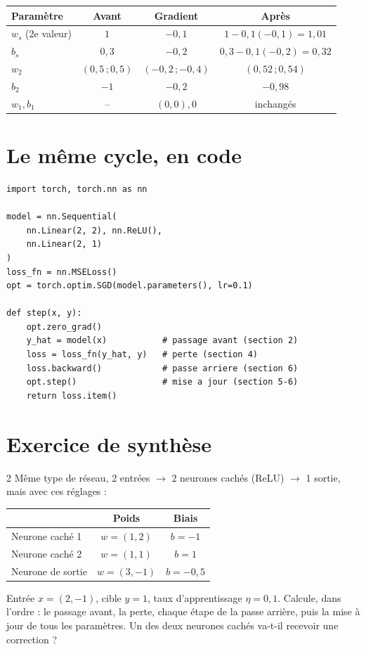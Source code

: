 \documentclass[11pt]{article}
\begin{document}
\begin{table}[h]
\centering
\small
\begin{tabular}{lccc}
\toprule
Paramètre & Avant & Gradient & Après \\
\midrule
$w_s$ (2e valeur) & $1$ & $-0{,}1$ & $1-0{,}1(-0{,}1)=1{,}01$ \\
$b_s$ & $0{,}3$ & $-0{,}2$ & $0{,}3-0{,}1(-0{,}2)=0{,}32$ \\
$w_2$ & $(0{,}5\,;0{,}5)$ & $(-0{,}2\,;-0{,}4)$ & $(0{,}52\,;0{,}54)$ \\
$b_2$ & $-1$ & $-0{,}2$ & $-0{,}98$ \\
$w_1,b_1$ & -- & $(0,0),0$ & inchangés \\
\bottomrule
\end{tabular}
\end{table}

\section{Le même cycle, en code}

\begin{lstlisting}
import torch, torch.nn as nn

model = nn.Sequential(
    nn.Linear(2, 2), nn.ReLU(),
    nn.Linear(2, 1)
)
loss_fn = nn.MSELoss()
opt = torch.optim.SGD(model.parameters(), lr=0.1)

def step(x, y):
    opt.zero_grad()
    y_hat = model(x)           # passage avant (section 2)
    loss = loss_fn(y_hat, y)   # perte (section 4)
    loss.backward()            # passe arriere (section 6)
    opt.step()                 # mise a jour (section 5-6)
    return loss.item()
\end{lstlisting}

\section{Exercice de synthèse}

\begin{exo}{2}
Même type de réseau, 2 entrées $\to$ 2 neurones cachés (ReLU) $\to$ 1 sortie, mais avec ces réglages :

\begin{table}[h]
\centering
\begin{tabular}{lcc}
\toprule
 & Poids & Biais \\
\midrule
Neurone caché 1 & $w=(1,2)$ & $b=-1$ \\
Neurone caché 2 & $w=(1,1)$ & $b=1$ \\
Neurone de sortie & $w=(3,-1)$ & $b=-0{,}5$ \\
\bottomrule
\end{tabular}
\end{table}

Entrée $x=(2,-1)$, cible $y=1$, taux d'apprentissage $\eta=0{,}1$. Calcule, dans l'ordre : le passage avant, la perte, chaque étape de la passe arrière, puis la mise à jour de tous les paramètres. Un des deux neurones cachés va-t-il recevoir une correction ?
\end{exo}
\end{document}
